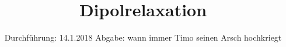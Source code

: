 

\subject{V 48}
\title{Dipolrelaxation}
\date{
  Durchführung: 14.1.2018
  \hspace{3em}
  Abgabe: wann immer Timo seinen Arsch hochkriegt
}



\maketitle
\thispagestyle{empty}
\tableofcontents
\newpage






\printbibliography




